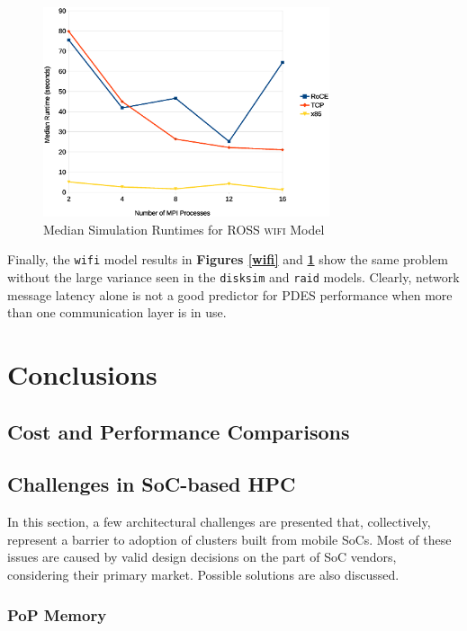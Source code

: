 \documentclass[11pt]{book}
\begin{document}
\begin{figure}
\centering
\includegraphics[width=0.75\textwidth]{wifi_median}
\caption{Median Simulation Runtimes for ROSS \textsc{wifi} Model}
\label{wifi-median}
\end{figure}

Finally, the \verb;wifi; model results in \textbf{Figures \ref{wifi}} and
\textbf{\ref{wifi-median}} show the same problem without the large variance seen
in the \verb;disksim; and \verb;raid; models. Clearly, network message latency
alone is not a good predictor for PDES performance when more than one
communication layer is in use.

\newpage
\chapter{Conclusions}
\label{conclusions}

\section{\textbf{Cost and Performance Comparisons}}

\section{\textbf{Challenges in SoC-based HPC}}

In this section, a few architectural challenges are presented that,
collectively, represent a barrier to adoption of clusters built from mobile
SoCs. Most of these issues are caused by valid design decisions on the part of
SoC vendors, considering their primary market. Possible solutions are also
discussed.

\subsection{\textbf{PoP Memory}}
\end{document}
